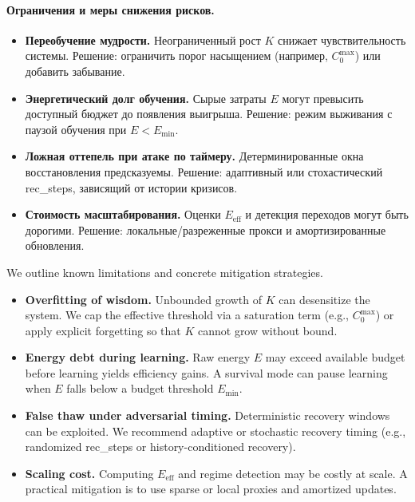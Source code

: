 ﻿\documentclass[12pt,a4paper]{article}
\begin{document}
\paragraph{Ограничения и меры снижения рисков.}
\begin{itemize}
    \item \textbf{Переобучение мудрости.} Неограниченный рост $K$ снижает чувствительность системы. Решение: ограничить порог насыщением (например, $C_0^{\max}$) или добавить забывание.
    \item \textbf{Энергетический долг обучения.} Сырые затраты $E$ могут превысить доступный бюджет до появления выигрыша. Решение: режим выживания с паузой обучения при $E<E_{\mathrm{min}}$.
    \item \textbf{Ложная оттепель при атаке по таймеру.} Детерминированные окна восстановления предсказуемы. Решение: адаптивный или стохастический rec\_steps, зависящий от истории кризисов.
    \item \textbf{Стоимость масштабирования.} Оценки $E_{\mathrm{eff}}$ и детекция переходов могут быть дорогими. Решение: локальные/разреженные прокси и амортизированные обновления.
\end{itemize}
We outline known limitations and concrete mitigation strategies.
\begin{itemize}
    \item \textbf{Overfitting of wisdom.} Unbounded growth of $K$ can desensitize the system. We cap the effective threshold via a saturation term (e.g., $C_0^{\max}$) or apply explicit forgetting so that $K$ cannot grow without bound.
    \item \textbf{Energy debt during learning.} Raw energy $E$ may exceed available budget before learning yields efficiency gains. A survival mode can pause learning when $E$ falls below a budget threshold $E_{\mathrm{min}}$.
    \item \textbf{False thaw under adversarial timing.} Deterministic recovery windows can be exploited. We recommend adaptive or stochastic recovery timing (e.g., randomized rec\_steps or history-conditioned recovery).
    \item \textbf{Scaling cost.} Computing $E_{\mathrm{eff}}$ and regime detection may be costly at scale. A practical mitigation is to use sparse or local proxies and amortized updates.
\end{itemize}
\end{document}
